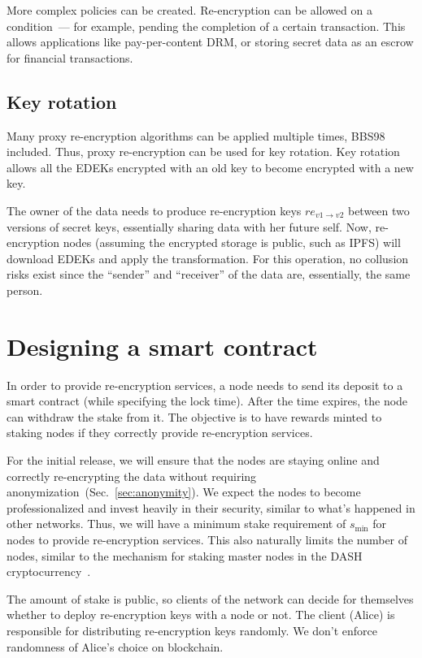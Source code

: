 \documentclass[longbibliography,nofootinbib]{revtex4-1}
\begin{document}
More complex policies can be created.
Re-encryption can be allowed on a condition~--- for example, pending the completion of a certain transaction.
This allows applications like pay-per-content DRM, or storing secret data as an escrow for financial transactions.

\subsection{Key rotation}
\label{sec:key-rotation}

Many proxy re-encryption algorithms can be applied multiple times, BBS98~\cite{BBS98} included.
Thus, proxy re-encryption can be used for key rotation.
Key rotation allows all the EDEKs encrypted with an old key to become encrypted with a new key.

The owner of the data needs to produce re-encryption keys $re_{v1\rightarrow v2}$ between two versions of secret keys, essentially
sharing data with her future self.
Now, re-encryption nodes (assuming the encrypted storage is public, such as IPFS) will download EDEKs and apply the transformation.
For this operation, no collusion risks exist since the ``sender'' and ``receiver'' of the data are, essentially, the same person.

\section{Designing a smart contract}
\label{sec:smart-contract}
In order to provide re-encryption services, a node needs to send its deposit to a smart contract (while specifying the lock time).
After the time expires, the node can withdraw the stake from it.
The objective is to have rewards minted to staking nodes if they correctly provide re-encryption services.

For the initial release, we will ensure that the nodes are staying online and correctly re-encrypting the data without requiring
anonymization~(Sec.~\ref{sec:anonymity}).
We expect the nodes to become professionalized and invest heavily in their security, similar to what's happened in other networks.
Thus, we will have a minimum stake requirement of $s_{\min}$ for nodes to provide re-encryption services.
This also naturally limits the number of nodes, similar to the mechanism for staking master nodes in the DASH cryptocurrency~\cite{dash:whitepaper}.

The amount of stake is public, so clients of the network can decide for themselves whether to deploy re-encryption keys with a node or not.
The client (Alice) is responsible for distributing re-encryption keys randomly.
We don't enforce randomness of Alice's choice on blockchain.
\end{document}
